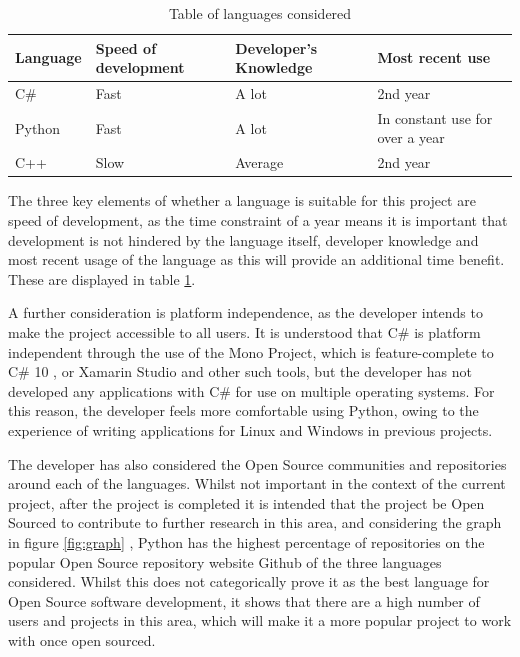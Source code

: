 \begin{table}[H]
\centering
\begin{tabular}{| l | l | l | l |} \hline
  {Language} & {Speed of development} & {Developer's Knowledge} & {Most recent use} \\ \hline
  C\# & Fast & A lot & 2nd year \\ \hline
  Python & Fast & A lot & In constant use for over a year \\ \hline
  C++ & Slow & Average & 2nd year \\ \hline
\end{tabular}
\caption{Table of languages considered}
\label{table:langs}
\end{table}
The three key elements of whether a language is suitable for this project are speed of development, as the time constraint of a year means it is important that development is not hindered by the language itself, developer knowledge and most recent usage of the language as this will provide an additional time benefit. These are displayed in table \ref{table:langs}.

A further consideration is platform independence, as the developer intends to make the project accessible to all users. It is understood that C\# is platform independent through the use of the Mono Project, which is feature-complete to C\# 10 \parencite{MonoDev}, or Xamarin Studio and other such tools, but the developer has not developed any applications with C\# for use on multiple operating systems. For this reason, the developer feels more comfortable using Python, owing to the experience of writing applications for Linux and Windows in previous projects. 

The developer has also considered the Open Source communities and repositories around each of the languages. Whilst not important in the context of the current project, after the project is completed it is intended that the project be Open Sourced to contribute to further research in this area, and considering the graph in figure \ref{fig:graph} \parencite{Redmonk}, Python has the highest percentage of repositories on the popular Open Source repository website Github of the three languages considered. Whilst this does not categorically prove it as the best language for Open Source software development, it shows that there are a high number of users and projects in this area, which will make it a more popular project to work with once open sourced.

